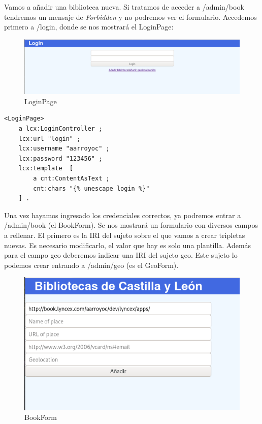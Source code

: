 \documentclass[12pt]{report} %
\begin{document}
Vamos a añadir una biblioteca nueva. Si tratamos de acceder a /admin/book tendremos un mensaje de \textit{Forbidden} y no podremos ver el formulario. Accedemos primero a /login, donde se nos mostrará el LoginPage:

\begin{figure}
    \centering
    \includegraphics{tour/bibliocyl4.png}
    \caption{LoginPage}
    \label{fig:bibliocyl4}
\end{figure}

\begin{lstlisting}
<LoginPage>
    a lcx:LoginController ;
    lcx:url "login" ;
    lcx:username "aarroyoc" ;
    lcx:password "123456" ;
    lcx:template  [
        a cnt:ContentAsText ;
        cnt:chars "{% unescape login %}"
    ] .
\end{lstlisting}

Una vez hayamos ingresado los credenciales correctos, ya podremos entrar a /admin/book (el BookForm). Se nos mostrará un formulario con diversos campos a rellenar. El primero es la IRI del sujeto sobre el que vamos a crear tripletas nuevas. Es necesario modificarlo, el valor que hay es solo una plantilla. Además para el campo geo deberemos indicar una IRI del sujeto geo. Este sujeto lo podemos crear entrando a /admin/geo (es el GeoForm).

\begin{figure}
    \centering
    \includegraphics{tour/bibliocyl5.png}
    \caption{BookForm}
    \label{fig:bibliocyl5}
\end{figure}
\end{document}
